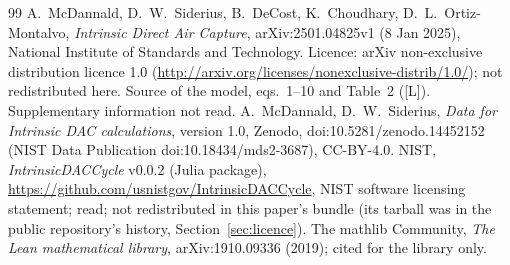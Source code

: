 \documentclass[10pt]{article}
\newcommand{\tier}[1]{\textsf{[#1]}}
\newcommand{\tL}{\tier{L}}
\begin{document}
\begin{thebibliography}{99}\small
{} A.~McDannald, D.~W.~Siderius, B.~DeCost, K.~Choudhary, D.~L.~Ortiz-Montalvo, \emph{Intrinsic Direct Air Capture}, arXiv:2501.04825v1 (8 Jan 2025), National Institute of Standards and Technology. Licence: arXiv non-exclusive distribution licence 1.0 (\url{http://arxiv.org/licenses/nonexclusive-distrib/1.0/}); not redistributed here. Source of the model, eqs.~1--10 and Table~2 (\tL). Supplementary information not read.
 A.~McDannald, D.~W.~Siderius, \emph{Data for Intrinsic DAC calculations}, version 1.0, Zenodo, doi:10.5281/zenodo.14452152 (NIST Data Publication doi:10.18434/mds2-3687), CC-BY-4.0.
 NIST, \emph{IntrinsicDACCycle} v0.0.2 (Julia package), \url{https://github.com/usnistgov/IntrinsicDACCycle}, NIST software licensing statement; read; not redistributed in this paper's bundle (its tarball was in the public repository's history, Section~\ref{sec:licence}).
 The mathlib Community, \emph{The Lean mathematical library}, arXiv:1910.09336 (2019); cited for the library only.
\end{thebibliography}
\end{document}
